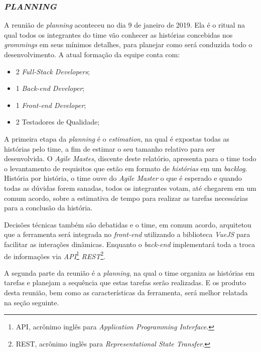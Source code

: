 \documentclass[
  12pt,				%
  openany,
  oneside,
  a4paper,			%
  english,			%
  brazil
]{article}
\numberwithin{figure}{section}
\numberwithin{table}{section}
\begin{document}
\subsubsection{\textit{PLANNING}}

A reunião de \textit{planning} aconteceu no dia 9 de janeiro de 2019. Ela é o ritual na qual todos os integrantes do time vão conhecer as histórias concebidas nos \textit{grommings} em seus mínimos detalhes, para planejar como será conduzida todo o desenvolvimento. A atual formação da equipe conta com:

\vspace{-10mm}
\begin{singlespace}
	\begin{itemize}
		\item 2 \textit{Full-Stack Developers};
		\item 1 \textit{Back-end Developer};
		\item 1 \textit{Front-end Developer};
		\item 2 Testadores de Qualidade;
	\end{itemize}
\end{singlespace}
\vspace{-5mm}

A primeira etapa da \textit{planning} é o \textit{estimation}, na qual é expostas todas as histórias pelo time, a fim de estimar o seu tamanho relativo para ser desenvolvida. O \textit{Agile Mastes}, discente deste relatório, apresenta para o time todo o levantamento de requisitos que estão em formato de \textit{histórias} em um \textit{backlog}. História por história, o time ouve do \textit{Agile Master} o que é esperado e quando todas as dúvidas forem sanadas, todos os integrantes votam, até chegarem em um comum acordo, sobre a estimativa de tempo para realizar as tarefas necessárias para a conclusão da história.

Decisões técnicas também são debatidas e o time, em comum acordo, arquitetou que a ferramenta será integrada no \textit{front-end} utilizando a biblioteca \textit{VueJS} para facilitar as interações dinâmicas. Enquanto o \textit{back-end} implementará toda a troca de informações via \textit{API}\footnote{API, acrônimo inglês para \textit{Application Programming Interface}.} \textit{REST}\footnote{REST, acrônimo inglês para \textit{Representational State Transfer}.}.

A segunda parte da reunião é a \textit{planning}, na qual o time organiza as histórias em tarefas e planejam a sequência que estas tarefas serão realizadas. E os produto desta reunião, bem como as características da ferramenta, será melhor relatada na seção seguinte.
\end{document}
